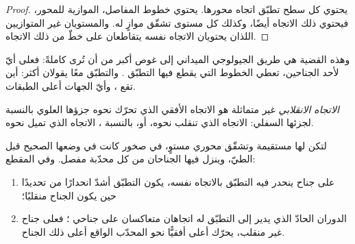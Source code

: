 \begin{proof}
يحتوي كل سطح تطبّق  اتجاه محورها.  يحتوي خطوط المفاصل، الموازية للمحور، فيحتوي ذلك الاتجاه أيضًا، وكذلك كل مستوى تشقّق موازٍ له. والمستويان غير المتوازيين اللذان يحتويان الاتجاه نفسه يتقاطعان على خطّ من ذلك الاتجاه.
\end{proof}

وهذه القضية هي طريق الجيولوجي الميداني إلى غوص  أكبر من أن تُرى كاملةً: فعلى أيّ  لأحد الجناحين، تعطي الخطوط التي يقطع فيها  التطبّق . والتطبّق  معًا يقولان أكثر: أين تقع ، وأيّ الجهات أعلى الطبقات.

\begin{definition}\label{def:b1:faults-folds-fabrics:vergence}
\emph{الاتجاه الانقلابي}  غير متماثلة هو الاتجاه الأفقي الذي تحرّك نحوه جزؤها العلوي بالنسبة لجزئها السفلي: الاتجاه الذي تنقلب نحوه، أو، بالنسبة ، الاتجاه الذي تميل نحوه.
\end{definition}

\begin{proposition}\label{prop:b1:faults-folds-fabrics:cleavage-bedding}
لتكن  لها  مستقيمة وتشقّق محوري مستوٍ، في صخور كانت في وضعها الصحيح قبل الطيّ، وينزل فيها الجناحان من كل  محدّبة مفصل. وفي المقطع:
\begin{enumerate}[label=(\alph*)]
  \item على جناح ينحدر فيه التطبّق  بالاتجاه نفسه، يكون التطبّق أشدّ انحدارًا من  تحديدًا حين يكون الجناح منقلبًا؛
  \item الدوران الحادّ الذي يدير  إلى التطبّق له اتجاهان متعاكسان على جناحي ؛ فعلى جناح غير منقلب، يحرّك أعلى  أفقيًّا نحو  المحدّب الواقع أعلى ذلك الجناح.
\end{enumerate}
\end{proposition}

